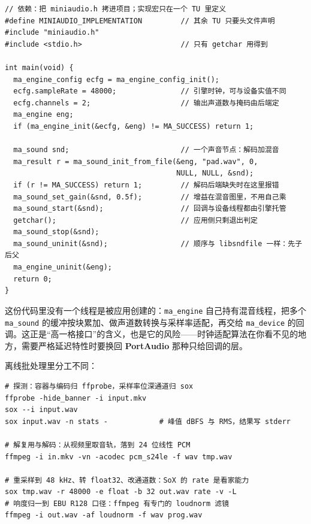 \documentclass[12pt,a4paper,fontset=fandol]{ctexbook}
\newcommand{\Tp}[1]{\texttt{#1}}
\newcommand{\Lib}[1]{\textbf{#1}}
\begin{document}
\begin{lstlisting}[style=cstyle,label={lst:ch11-miniaudio},caption={miniaudio：设备与引擎两层，混音与声道转换都在库内}]
// 依赖：把 miniaudio.h 拷进项目；实现宏只在一个 TU 里定义
#define MINIAUDIO_IMPLEMENTATION         // 其余 TU 只要头文件声明
#include "miniaudio.h"
#include <stdio.h>                       // 只有 getchar 用得到

int main(void) {
  ma_engine_config ecfg = ma_engine_config_init();
  ecfg.sampleRate = 48000;               // 引擎时钟，可与设备实值不同
  ecfg.channels = 2;                     // 输出声道数与掩码由后端定
  ma_engine eng;
  if (ma_engine_init(&ecfg, &eng) != MA_SUCCESS) return 1;

  ma_sound snd;                          // 一个声音节点：解码加混音
  ma_result r = ma_sound_init_from_file(&eng, "pad.wav", 0,
                                        NULL, NULL, &snd);
  if (r != MA_SUCCESS) return 1;         // 解码后端缺失时在这里报错
  ma_sound_set_gain(&snd, 0.5f);         // 增益在混音图里，不用自己乘
  ma_sound_start(&snd);                  // 回调与设备线程都由引擎托管
  getchar();                             // 应用侧只剩退出判定
  ma_sound_stop(&snd);
  ma_sound_uninit(&snd);                 // 顺序与 libsndfile 一样：先子后父
  ma_engine_uninit(&eng);
  return 0;
}
\end{lstlisting}

这份代码里没有一个线程是被应用创建的：\Tp{ma\_engine} 自己持有混音线程，把多个 \Tp{ma\_sound} 的缓冲按块累加、做声道数转换与采样率适配，再交给 \Tp{ma\_device} 的回调。这正是``高一格接口''的含义，也是它的风险——时钟适配算法在你看不见的地方，需要严格延迟特性时要换回 \Lib{PortAudio} 那种只给回调的层。

离线批处理里分工不同：

\begin{lstlisting}[style=shellstyle,caption={探测与批量转换：ffmpeg 管容器与编解码，SoX 管音频专用 DSP}]
# 探测：容器与编码归 ffprobe，采样率位深通道归 sox
ffprobe -hide_banner -i input.mkv
sox --i input.wav
sox input.wav -n stats -            # 峰值 dBFS 与 RMS，结果写 stderr

# 解复用与解码：从视频里取音轨，落到 24 位线性 PCM
ffmpeg -i in.mkv -vn -acodec pcm_s24le -f wav tmp.wav

# 重采样到 48 kHz、转 float32、改通道数：SoX 的 rate 是看家能力
sox tmp.wav -r 48000 -e float -b 32 out.wav rate -v -L
# 响度归一到 EBU R128 口径：ffmpeg 有专门的 loudnorm 滤镜
ffmpeg -i out.wav -af loudnorm -f wav prog.wav
\end{lstlisting}
\end{document}
